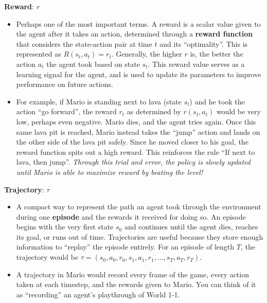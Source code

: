 \begin{flushleft}
    \textbf{Reward}: $r$
    \begin{itemize}
        \item Perhaps one of the most important terms. A reward is a scalar value given to the agent after it takes an action, determined through a \textbf{reward function} that considers the state-action pair at time $t$ and its ``optimality''. This is represented as $R(s_t, a_t) = r_t$. Generally, the higher $r$ is, the better the action $a_t$ the agent took based on state $s_t$. This reward value serves as a learning signal for the agent, and is used to update its parameters to improve performance on future actions.
        \item For example, if Mario is standing next to lava (state $s_t$) and he took the action ``go forward'', the reward $r_t$ as determined by $r(s_t, a_t)$ would be very low, perhaps even negative. Mario dies, and the agent tries again. Once this same lava pit is reached, Mario instead takes the ``jump'' action and lands on the other side of the lava pit safely. Since he moved closer to his goal, the reward function spits out a high reward. This reinforces the rule ``If next to lava, then jump''. \textit{Through this trial and error, the policy is slowly updated until Mario is able to maximize reward by beating the level!}
    \end{itemize}

    \textbf{Trajectory}: $\tau$
    \begin{itemize}
        \item A compact way to represent the path an agent took through the environment during one \textbf{episode} and the rewards it received for doing so. An episode begins with the very first state $s_0$ and continues until the agent dies, reaches its goal, or runs out of time. Trajectories are useful because they store enough information to ``replay'' the episode entirely. For an episode of length $T$, the trajectory would be $\tau = (s_0, a_0, r_0, s_1, a_1, r_1,...,s_T, a_T, r_T)$.
        \item A trajectory in Mario would record every frame of the game, every action taken at each timestep, and the rewards given to Mario. You can think of it as ``recording'' an agent's playthrough of World 1-1.
    \end{itemize}
    
\end{flushleft}

